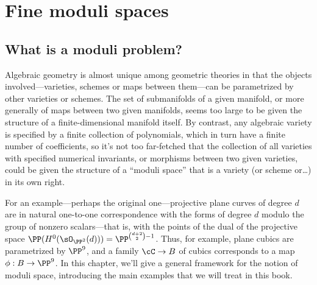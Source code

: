 

\chapter{Fine moduli spaces} 
\label{Moduli chapter}\label{ModuliChapter}

\section{What is a moduli problem?}

Algebraic geometry is almost unique among geometric theories in that the objects involved---varieties,  schemes or maps between them---can be parametrized by other varieties or schemes. The set of submanifolds of a given manifold, or more generally of maps between two given manifolds, seems too large to be given the structure of a finite-dimensional manifold itself. By contrast, any algebraic variety is specified by a finite collection of polynomials, which in turn have a finite number of coefficients, so it's not too far-fetched that the collection of all varieties with specified numerical invariants, or morphisms between two given varieties, could be given the structure of a ``moduli space'' that is a variety (or scheme or\dots) in its own right.

For an example---perhaps the original one---projective plane curves of degree $d$
are in natural one-to-one correspondence with the forms of degree $d$ modulo the group of nonzero scalars---that is, with the points of the dual of the projective space
$ \PP(H^0(\sO_{\PP^2}(d)))=\PP^{\binom{d+2}{2}-1} $.
Thus, for example, plane cubics are parametrized by $\PP^{9}$, and a  family $\cC \to B$ of cubics corresponds to a map $\phi: B \to \PP^9$.
In this chapter, we'll give a general framework for the notion of moduli space, introducing the main examples that we will treat in this book.


